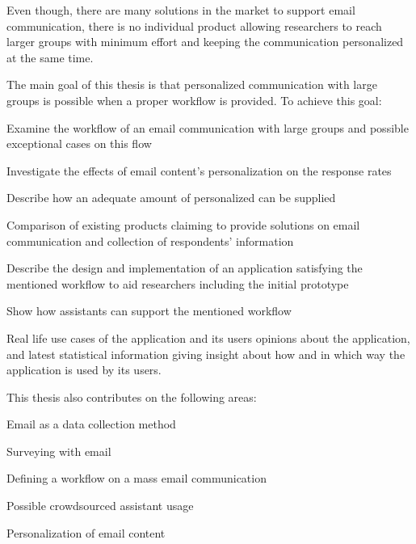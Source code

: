 Even though, there are many solutions in the market to support email communication, there is no individual product allowing researchers to reach larger groups with minimum effort and keeping the communication personalized at the same time.
\vspace{1cm}

The main goal of this thesis is that personalized communication with large groups is possible when a proper workflow is provided. To achieve this goal:

\begin{compactenum}
	\item Examine the workflow of an email communication with large groups and possible exceptional cases on this flow
	\item Investigate the effects of email content's personalization on the response rates
	\item Describe how an adequate amount of personalized can be supplied
	\item Comparison of  existing products claiming to provide solutions on email communication and collection of respondents' information
	\item Describe the design and implementation of an application satisfying the mentioned workflow to aid researchers including the initial prototype
	\item Show how assistants can support the mentioned workflow  
	\item Real life use cases of the application and its users opinions about the application, and latest statistical information giving insight about how and in which way the application is used by its users.
\end{compactenum}
\vspace{1cm}

This thesis also contributes on the following areas:

\begin{compactenum}
	\item Email as a data collection method
	\item Surveying with email
	\item Defining a workflow on a mass email communication
	\item Possible crowdsourced assistant usage
	\item Personalization of email content
\end{compactenum}


